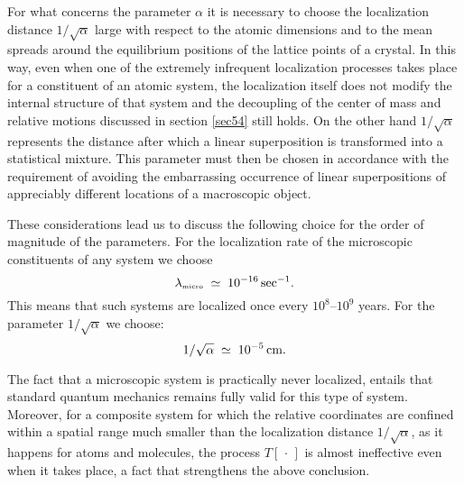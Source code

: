 \documentclass[10pt,a4paper]{article}
\begin{document}
For what concerns the parameter $\alpha$ it is necessary to choose
the localization distance $1/\sqrt{\alpha}$ large with respect to
the atomic dimensions and to the mean spreads around the
equilibrium positions of the lattice points of a crystal. In this
way, even when one of the extremely infrequent localization
processes takes place for a constituent of an atomic system, the
localization itself does not modify the internal structure of that
system and the decoupling of the center of mass and relative
motions discussed in section \ref{sec54} still holds. On the other
hand $1/\sqrt{\alpha}$ represents the distance after which a
linear superposition is transformed into a statistical mixture.
This parameter must then be chosen in accordance with the
requirement of avoiding the embarrassing occurrence of linear
superpositions of appreciably different locations of a macroscopic
object.

These considerations lead us to discuss the following choice for
the order of magnitude of the parameters. For the localization
rate of the microscopic constituents of any system we choose
\begin{equation}
\lambda_{\makebox{\tiny micro}} \; \simeq \; 10^{-16}\,
\makebox{sec}^{-1}.
\end{equation}
This means that such systems are localized once every
$10^{8}$--$10^{9}$ years. For the parameter $1/\sqrt{\alpha}$ we
choose:
\begin{equation}
1/\sqrt{\alpha} \; \simeq \; 10^{-5}\,\makebox{cm}.
\end{equation}

The fact that a microscopic system is practically never localized,
entails that standard quantum mechanics remains fully valid for
this type of system.  Moreover, for a composite system for which
the relative coordinates are confined within a spatial range much
smaller than the localization distance $1/\sqrt{\alpha}$, as it
happens for atoms and molecules, the process $T[\,\cdot\,]$ is
almost ineffective even when it takes place, a fact that
strengthens the above conclusion.
\end{document}
